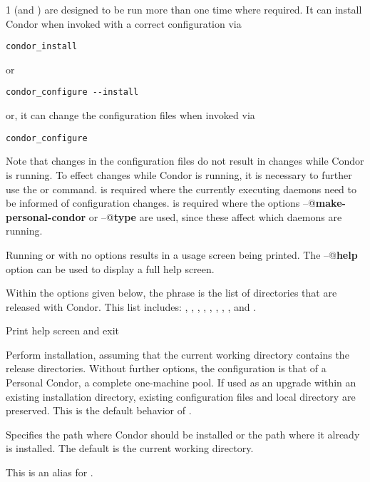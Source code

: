 \begin{ManPage}{\label{man-condor-configure}}{1}
 (and ) are designed to be run more
than one time where required.
It can install Condor when invoked with a correct configuration via
\begin{verbatim}
condor_install
\end{verbatim}
or 
\begin{verbatim}
condor_configure --install
\end{verbatim}
or, it can change the configuration files when invoked via
\begin{verbatim}
condor_configure
\end{verbatim}
Note that changes in the configuration files do not result
in changes while Condor is running.
To effect changes while Condor is running,
it is necessary to further use the  or 
command.
  is required where the currently executing
daemons need to be informed of configuration changes.
 is required where the options
\verb@--@\textbf{make-personal-condor} or
\verb@--@\textbf{type}
are used, since these affect which daemons are running.

Running  or  with no options results
in a usage screen being printed.
The \verb@--@\textbf{help} option can be used to display a full help screen.

Within the options given below, 
the phrase  is the list of directories that are
released with Condor.  This list includes: 
, , , ,
, , , ,
 and .

\begin{Options}
	 {Print help screen and exit}

	 {Perform installation, assuming that
	the current working directory contains the release directories.
	Without further options, the configuration is that of
	a Personal Condor, a complete one-machine pool.
	If used as an 
	upgrade within an existing installation directory, existing 
	configuration files and local directory are preserved.  This
	is the default behavior of . }

	 {Specifies the path
	where Condor should be installed or the path where it already is
	installed. The default is the current working directory.}

	 {This is an alias for
	.}


\end{Options}
\end{ManPage}

